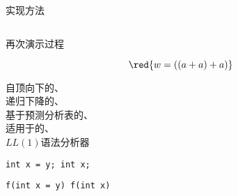 \begin{frame}{}
  \begin{center}
    {\large {}实现方法}

    \begin{columns}
        
        
        
    \end{columns}
  \end{center}
\end{frame}

\begin{frame}{}
  \begin{center}
    再次演示过程


    \vspace{-0.80cm}
    \[
      \red{w = ((a + a) + a)}
    \]
  \end{center}
\end{frame}

\begin{frame}{}
  \begin{center}
    自顶向下的、\\[15pt]
    递归下降的、\\[15pt]
    基于预测分析表的、\\[15pt]
    适用于的、\\[15pt]
    $LL(1)$语法分析器
  \end{center}
\end{frame}

\begin{frame}{}
  \begin{center}

    \pause
    \vspace{0.30cm}
    \texttt{int x = y; \qquad int x;}

    \vspace{0.20cm}
    \texttt{f(int x = y) \qquad f(int x)}
  \end{center}
\end{frame}


